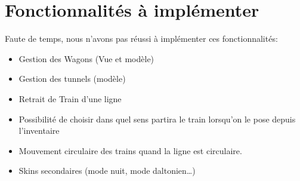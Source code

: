 \documentclass[report, backcover, french, nodocumentinfo]{upmethodology-document}
\begin{document}
	\section*{Fonctionnalités à implémenter}
		\p{}
		Faute de temps, nous n'avons pas réussi à implémenter ces fonctionnalités:
		\begin{itemize}
			\item Gestion des Wagons (Vue et modèle)
			\item Gestion des tunnels (modèle)
			\item Retrait de Train d'une ligne
			\item Possibilité de choisir dans quel sens partira le train lorsqu'on le pose depuis l'inventaire
			\item Mouvement circulaire des trains quand la ligne est circulaire.
			\item Skins secondaires (mode nuit, mode daltonien\ldots)
		\end{itemize}
\end{document}
